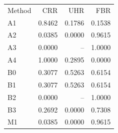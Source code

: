 \begin{tabular}{lrrr}
Method & CRR & UHR & FBR \\
A1 & 0.8462 & 0.1786 & 0.1538 \\
A2 & 0.0385 & 0.0000 & 0.9615 \\
A3 & 0.0000 & -- & 1.0000 \\
A4 & 1.0000 & 0.2895 & 0.0000 \\
B0 & 0.3077 & 0.5263 & 0.6154 \\
B1 & 0.3077 & 0.5263 & 0.6154 \\
B2 & 0.0000 & -- & 1.0000 \\
B3 & 0.2692 & 0.0000 & 0.7308 \\
M1 & 0.0385 & 0.0000 & 0.9615 \\
\end{tabular}

